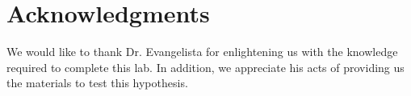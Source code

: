 \section{Acknowledgments}\label{sec:Acknowledgements}

We would like to thank Dr. Evangelista for enlightening us with the knowledge required to complete this lab. In addition, we appreciate his acts of providing us the materials to test this hypothesis.